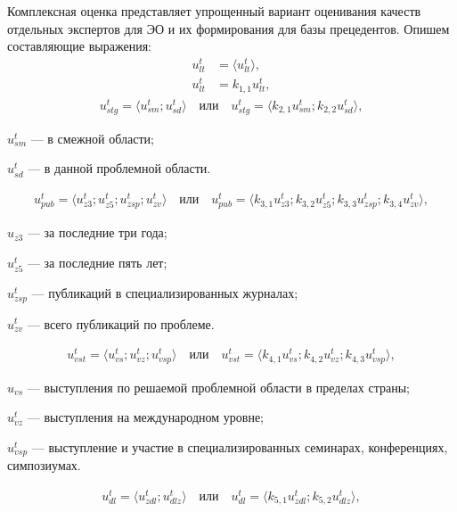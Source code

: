 Комплексная оценка представляет упрощенный вариант оценивания качеств отдельных экспертов для ЭО и их формирования для базы прецедентов. Опишем составляющие выражения:
\begin{align*}
	u^t_{lt} & = \langle u^t_{lt} \rangle, \\
	u^t_{lt} & = k_{1,1}u^t_{lt},
\end{align*}
\begin{align*}
	u^t_{stg} = \langle u^t_{sm} ; u^t_{sd} \rangle \quad \text{или} \quad u^t_{stg} = \langle k_{2,1} u^t_{sm} ; k_{2,2} u^t_{sd} \rangle,
\end{align*}
\begin{description}
	\item[где] $u^t_{sm}$ --- в смежной области;
	\item $u^t_{sd}$ --- в данной проблемной области.
\end{description}
\begin{align*}
	u^t_{pub} = \langle u^t_{z3} ; u^t_{z5} ; u^t_{zsp} ; u^t_{zv} \rangle \quad \text{или} \quad u^t_{pub} = \langle k_{3,1} u^t_{z3} ; k_{3,2} u^t_{z5} ; k_{3,3} u^t_{zsp} ; k_{3,4} u^t_{zv} \rangle,
\end{align*}
\begin{description}
	\item[где] $u_{z3}$ --- за последние три года;
	\item $u^t_{z5}$ --- за последние пять лет;
	\item $u^t_{zsp}$ --- публикаций в специализированных журналах;
	\item $u^t_{zv}$ --- всего публикаций по проблеме.
\end{description}
\begin{align*}
	u^t_{vst} = \langle u^t_{vs} ; u^t_{vz} ; u^t_{vsp} \rangle \quad \text{или} \quad u^t_{vst} = \langle k_{4,1} u^t_{vs} ; k_{4,2} u^t_{vz} ; k_{4,3} u^t_{vsp} \rangle,
\end{align*}
\begin{description}
	\item[где] $u_{vs}$ --- выступления по решаемой проблемной области в пределах страны;
	\item $u^t_{vz}$ --- выступления на международном уровне;
	\item $u^t_{vsp}$ --- выступление и участие в специализированных семинарах, конференциях, симпозиумах.
\end{description}
\begin{align*}
	u^t_{dl} = \langle u^t_{zdl} ; u^t_{dlz} \rangle \quad \text{или} \quad u^t_{dl} = \langle k_{5,1} u^t_{zdl} ; k_{5,2} u^t_{dlz} \rangle,
\end{align*}

